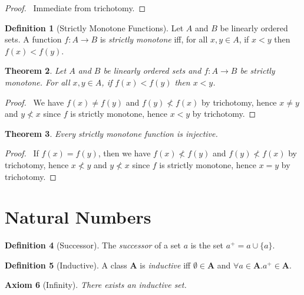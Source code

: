 \documentclass{article}
\let\qed\relax
\newtheorem{axiom}{Axiom}
\newtheorem{theorem}[axiom]{Theorem}
\theoremstyle{definition}
\newtheorem{definition}[axiom]{Definition}
\begin{document}
    \begin{proof}
        \pf\ Immediate from trichotomy. \qed
    \end{proof}

    \begin{definition}[Strictly Monotone Functions]
        Let $A$ and $B$ be linearly ordered sets. A function $f : A \rightarrow B$ is \emph{strictly
        monotone} iff, for all $x, y \in A$, if $x < y$ then $f(x) < f(y)$.
    \end{definition}

    \begin{theorem}
        Let $A$ and $B$ be linearly ordered sets and $f : A \rightarrow B$ be strictly monotone.
        For all $x, y \in A$, if $f(x) < f(y)$ then $x < y$.
    \end{theorem}

    \begin{proof}
        \pf\ We have $f(x) \neq f(y)$ and $f(y) \not < f(x)$ by trichotomy, hence $x \neq y$ and $y \not < x$
        since $f$ is strictly monotone, hence $x < y$ by trichotomy. \qed
    \end{proof}

    \begin{theorem}
        Every strictly monotone function is injective.
    \end{theorem}

    \begin{proof}
        \pf\ If $f(x) = f(y)$, then we have $f(x) \not < f(y)$ and $f(y) \not < f(x)$ by trichotomy,
        hence $x \not < y$ and $y \not < x$ since $f$ is strictly monotone, hence $x = y$ by
        trichotomy. \qed
    \end{proof}
    \section{Natural Numbers}

    \begin{definition}[Successor]
        The \emph{successor} of a set $a$ is the set $a^+ = a \cup \{ a \}$.
    \end{definition}

    \begin{definition}[Inductive]
        A class $\mathbf{A}$ is \emph{inductive} iff $\emptyset \in \mathbf{A}$ and
        $\forall a \in \mathbf{A}. a^+ \in \mathbf{A}$.
    \end{definition}

    \begin{axiom}[Infinity]
        There exists an inductive set.
    \end{axiom}
\end{document}
